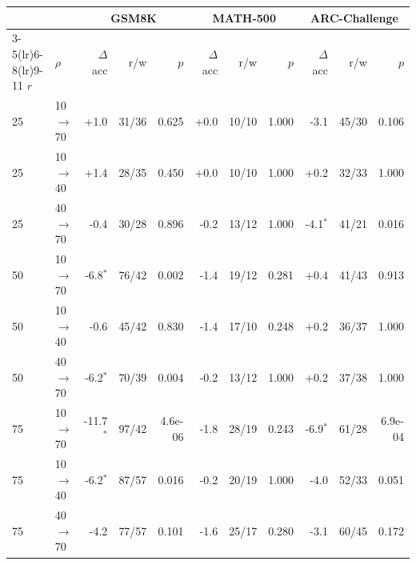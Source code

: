 \begin{tabular}{ll rrr rrr rrr}
\toprule
& & \multicolumn{3}{c}{\textbf{GSM8K}} & \multicolumn{3}{c}{\textbf{MATH-500}} & \multicolumn{3}{c}{\textbf{ARC-Challenge}} \\
\cmidrule(lr){3-5}\cmidrule(lr){6-8}\cmidrule(lr){9-11}
\textbf{$r$} & \textbf{$\rho$} & $\Delta$acc & r/w & $p$ & $\Delta$acc & r/w & $p$ & $\Delta$acc & r/w & $p$ \\
\midrule
25 & 10$\to$70 & +1.0 & 31/36 & 0.625 & +0.0 & 10/10 & 1.000 & -3.1 & 45/30 & 0.106 \\
25 & 10$\to$40 & +1.4 & 28/35 & 0.450 & +0.0 & 10/10 & 1.000 & +0.2 & 32/33 & 1.000 \\
25 & 40$\to$70 & -0.4 & 30/28 & 0.896 & -0.2 & 13/12 & 1.000 & -4.1$^{*}$ & 41/21 & 0.016 \\
50 & 10$\to$70 & -6.8$^{*}$ & 76/42 & 0.002 & -1.4 & 19/12 & 0.281 & +0.4 & 41/43 & 0.913 \\
50 & 10$\to$40 & -0.6 & 45/42 & 0.830 & -1.4 & 17/10 & 0.248 & +0.2 & 36/37 & 1.000 \\
50 & 40$\to$70 & -6.2$^{*}$ & 70/39 & 0.004 & -0.2 & 13/12 & 1.000 & +0.2 & 37/38 & 1.000 \\
75 & 10$\to$70 & -11.7$^{*}$ & 97/42 & 4.6e-06 & -1.8 & 28/19 & 0.243 & -6.9$^{*}$ & 61/28 & 6.9e-04 \\
75 & 10$\to$40 & -6.2$^{*}$ & 87/57 & 0.016 & -0.2 & 20/19 & 1.000 & -4.0 & 52/33 & 0.051 \\
75 & 40$\to$70 & -4.2 & 77/57 & 0.101 & -1.6 & 25/17 & 0.280 & -3.1 & 60/45 & 0.172 \\
\bottomrule
\end{tabular}
